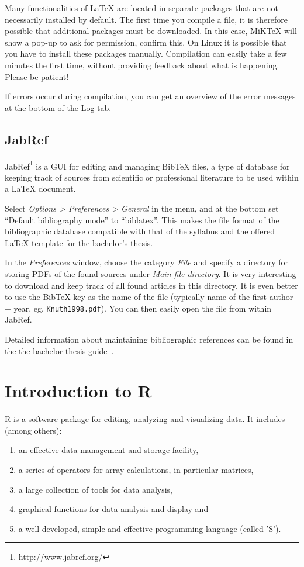 Many functionalities of \LaTeX{} are located in separate packages that are not necessarily installed by default.
The first time you compile a file, it is therefore possible that additional packages must be downloaded.
In this case, MiK\TeX{} will show a pop-up to ask for permission, confirm this. 
On Linux it is possible that you have to install these packages manually. 
Compilation can easily take a few minutes the first time, without providing feedback about what is happening. Please be patient!

If errors occur during compilation, you can get an overview of the error messages at the bottom of the Log tab.

\subsection{JabRef}

JabRef\footnote{\url{http://www.jabref.org/}} is a GUI for editing and managing Bib\TeX{} files, a type of database for keeping track of sources from scientific or professional literature to be used within a \LaTeX{} document.

Select \emph{Options > Preferences > General} in the menu, and at the bottom set ``Default bibliography mode'' to ``biblatex''. This makes the file format of the bibliographic database compatible with that of the syllabus and the offered \LaTeX{} template for the bachelor's thesis.

In the \emph{Preferences} window, choose the category \emph{File} and specify a directory for storing PDFs of the found sources under \emph{Main file directory}. It is very interesting to download and keep track of all found articles in this directory. It is even better to use the Bib\TeX{} key as the name of the file (typically name of the first author + year, eg. \texttt{Knuth1998.pdf}). You can then easily open the file from within JabRef.

Detailed information about maintaining bibliographic references can be found in the the bachelor thesis guide~\autocite{VanVreckem2017}.


\section{Introduction to R}

R is a software package for editing, analyzing and visualizing data. It includes (among others):

\begin{enumerate}
    \item an effective data management and storage facility,
    \item a series of operators for array calculations, in particular matrices,
    \item a large collection of tools for data analysis,
    \item graphical functions for data analysis and display and
    \item a well-developed, simple and effective programming language (called 'S').
\end{enumerate}


